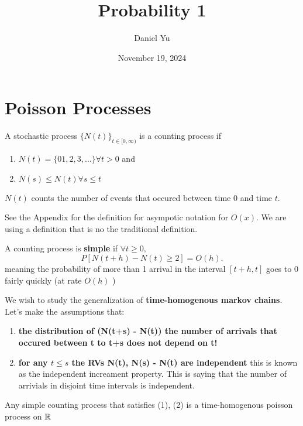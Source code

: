 \documentclass[a4paper]{article}
\title{\Huge{Probability 1}}
\author{\huge{Daniel Yu}}
\date{November 19, 2024}
\begin{document}
\maketitle
\newpage%
\tableofcontents
\pagebreak
\section{Poisson Processes}

\begin{definition}
  A stochastic process $\{N(t)\}_{t \in [0, \infty)} $ is a counting process if
\begin{enumerate}
  \item $N(t) = \{01,2,3,\ldots\} \forall t > 0 $ and
  \item $N(s) \leq N(t) \forall s \leq t$
\end{enumerate}
$N(t)$ counts the number of events that occured between time  $0$ and time  $t$.
\end{definition}


\begin{note}
  See the Appendix for the definition for asympotic notation for $O(x)$. We are using a definition that is no the traditional definition. 
\end{note}
\begin{definition}

A counting process is \textbf{simple} if $\forall t \geq 0,$
 \[
   P[N(t + h) - N(t) \geq 2] = O(h)
.\] 
meaning the probability of more than 1 arrival in the interval $[t+h, t]$ goes to 0 fairly quickly (at rate $O(h)$ )
  
\end{definition}

\noindent\hrulefill

We wish to study the generalization of \textbf{time-homogenous markov chains}. Let's make the assumptions that:
\begin{enumerate}
  \item \textbf{the distribution of (N(t+s) - N(t)) the number of arrivals that occured between t to t+s does not depend on t!}
  \item \textbf{for any $t \leq s$ the RVs N(t), N(s) - N(t) are independent} this is known as the independent increament property. This is saying that the number of arrivials in disjoint time intervals is independent. 
\end{enumerate}

\begin{definition}
  Any simple counting process that satisfies (1), (2) is a time-homogenous poisson process on $\mathbb{R}$
\end{definition}
\end{document}

